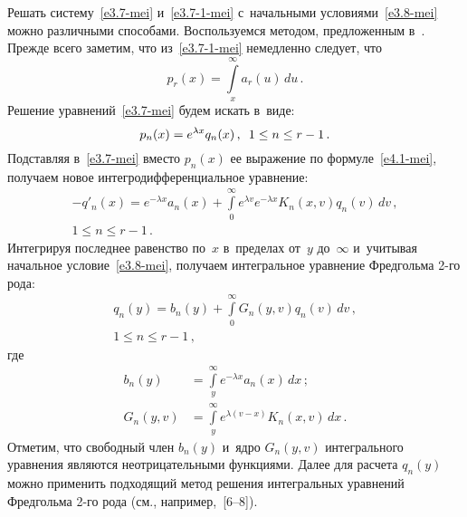 \begin{multicols}{2}
Решать систему~\eqref{e3.7-mei} и~\eqref{e3.7-1-mei}
с~начальными условиями~\eqref{e3.8-mei} можно различными способами.
Воспользуемся методом, предложенным в~\cite{n1}.
Прежде всего заметим, что из~\eqref{e3.7-1-mei} немедленно следует, что
\begin{equation*}
p_r(x) = \int\limits_x^\infty a_r(u) \,du\,.
\end{equation*}
Решение уравнений~\eqref{e3.7-mei} будем искать в~виде:
\begin{equation}
\label{e4.1-mei}
p_n(x) = e^{\lambda x} q_n(x)\,,\enskip 1 \le n \le r-1\,.
\end{equation}
Подставляя в~\eqref{e3.7-mei} вместо $p_n(x)$ ее выражение
по формуле~\eqref{e4.1-mei}, получаем новое интегродифференциальное уравнение:
\begin{multline*}
- q'_n(x) = e^{-\lambda x} a_n(x) +
\int\limits_0^\infty e^{\lambda v} e^{-\lambda x} K_n(x,v) q_n(v)\, dv\,, \\
1 \le n \le r-1\,.
\end{multline*}
Интегрируя последнее равенство по~$x$ в~пределах от~$y$ до~$\infty$ и~учитывая
начальное условие~\eqref{e3.8-mei}, получаем
интегральное уравнение Фредгольма 2-го рода:
\begin{multline}
\label{e2.1n-mei}
q_n(y)= b_n(y) + \int\limits_0^\infty
G_n(y,v) q_n(v)\, dv \,, \\ 
1 \le n \le r-1\,,
\end{multline}
где
\begin{align*}
b_n(y) &= \int\limits_y^\infty e^{-\lambda x} a_n(x)\, dx\,; \\
G_n(y,v) &= \int\limits_y^\infty e^{\lambda (v-x)} K_n(x,v)\, dx\,.                              %
\end{align*}
Отметим, что свободный член $b_n(y)$ и~ядро
$G_n(y,v)$ интегрального уравнения являются неотрицательными функциями.
Далее для расчета $q_n(y)$ можно применить
подходящий метод решения интегральных уравнений Фредгольма 2-го рода
(см., например,~[6--8]).


\end{multicols}
